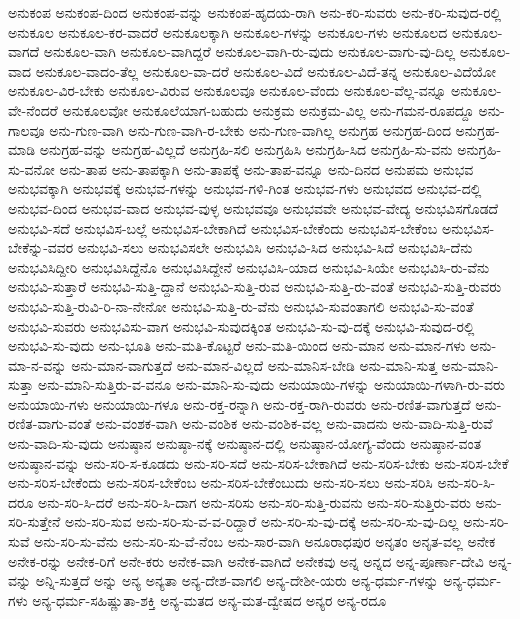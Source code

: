 {ಅನುಕಂಪ
ಅನುಕಂಪ-ದಿಂದ
ಅನುಕಂಪ-ವನ್ನು
ಅನುಕಂಪ-ಹೃದಯ-ರಾಗಿ
ಅನು-ಕರಿ-ಸುವರು
ಅನು-ಕರಿ-ಸುವುದ-ರಲ್ಲಿ
ಅನುಕೂಲ
ಅನುಕೂಲ-ಕರ-ವಾದರೆ
ಅನುಕೂಲಕ್ಕಾಗಿ
ಅನುಕೂಲ-ಗಳನ್ನು
ಅನುಕೂಲ-ಗಳು
ಅನುಕೂಲದ
ಅನುಕೂಲ-ವಾಗದೆ
ಅನುಕೂಲ-ವಾಗಿ
ಅನುಕೂಲ-ವಾಗಿದ್ದರೆ
ಅನುಕೂಲ-ವಾಗಿ-ರು-ವುದು
ಅನುಕೂಲ-ವಾಗು-ವು-ದಿಲ್ಲ
ಅನುಕೂಲ-ವಾದ
ಅನುಕೂಲ-ವಾದಂ-ತೆಲ್ಲ
ಅನುಕೂಲ-ವಾ-ದರೆ
ಅನುಕೂಲ-ವಿದೆ
ಅನುಕೂಲ-ವಿದೆ-ತನ್ನ
ಅನುಕೂಲ-ವಿದೆಯೋ
ಅನುಕೂಲ-ವಿರ-ಬೇಕು
ಅನುಕೂಲ-ವಿರುವ
ಅನುಕೂಲವೂ
ಅನುಕೂಲ-ವೆಂದು
ಅನುಕೂಲ-ವೆಲ್ಲ-ವನ್ನೂ
ಅನುಕೂಲ-ವೇ-ನೆಂದರೆ
ಅನುಕೂಲವೋ
ಅನುಕೂಲೆಯಾಗ-ಬಹುದು
ಅನುಕ್ರಮ
ಅನುಕ್ರಮ-ವಿಲ್ಲ
ಅನು-ಗಮನ-ರೂಪದ್ದೂ
ಅನು-ಗಾಲವೂ
ಅನು-ಗುಣ-ವಾಗಿ
ಅನು-ಗುಣ-ವಾಗಿ-ರ-ಬೇಕು
ಅನು-ಗುಣ-ವಾಗಿಲ್ಲ
ಅನುಗ್ರಹ
ಅನುಗ್ರಹ-ದಿಂದ
ಅನುಗ್ರಹ-ಮಾಡಿ
ಅನುಗ್ರಹ-ವನ್ನು
ಅನುಗ್ರಹ-ವಿಲ್ಲದೆ
ಅನುಗ್ರಹಿ-ಸಲಿ
ಅನುಗ್ರಹಿಸಿ
ಅನುಗ್ರಹಿ-ಸಿದ
ಅನುಗ್ರಹಿ-ಸು-ವನು
ಅನುಗ್ರಹಿ-ಸು-ವನೋ
ಅನು-ತಾಪ
ಅನು-ತಾಪಕ್ಕಾಗಿ
ಅನು-ತಾಪಕ್ಕೆ
ಅನು-ತಾಪ-ವನ್ನೂ
ಅನು-ದಿನದ
ಅನುಪಮ
ಅನುಭವ
ಅನುಭವಕ್ಕಾಗಿ
ಅನುಭವಕ್ಕೆ
ಅನುಭವ-ಗಳನ್ನು
ಅನುಭವ-ಗಳಿ-ಗಿಂತ
ಅನುಭವ-ಗಳು
ಅನುಭವದ
ಅನುಭವ-ದಲ್ಲಿ
ಅನುಭವ-ದಿಂದ
ಅನುಭವ-ವಾದ
ಅನುಭವ-ವುಳ್ಳ
ಅನುಭವವೂ
ಅನುಭವವೇ
ಅನುಭವ-ವೇದ್ಯ
ಅನುಭವಿಸಗೊಡದೆ
ಅನುಭವಿ-ಸದೆ
ಅನುಭವಿಸ-ಬಲ್ಲೆ
ಅನುಭವಿಸ-ಬೇಕಾಗಿದೆ
ಅನುಭವಿಸ-ಬೇಕೆಂದು
ಅನುಭವಿಸ-ಬೇಕೆಂಬ
ಅನುಭವಿಸ-ಬೇಕೆನ್ನು-ವವರ
ಅನುಭವಿ-ಸಲು
ಅನುಭವಿಸಲೇ
ಅನುಭವಿಸಿ
ಅನುಭವಿ-ಸಿದ
ಅನುಭವಿ-ಸಿದೆ
ಅನುಭವಿಸಿ-ದೆನು
ಅನುಭವಿಸಿದ್ದೀರಿ
ಅನುಭವಿಸಿದ್ದೆನೊ
ಅನುಭವಿಸಿದ್ದೇನೆ
ಅನುಭವಿಸಿ-ಯಾದ
ಅನುಭವಿ-ಸಿಯೇ
ಅನುಭವಿಸಿ-ರು-ವೆನು
ಅನುಭವಿ-ಸುತ್ತಾರೆ
ಅನುಭವಿ-ಸುತ್ತಿ-ದ್ದಾನೆ
ಅನುಭವಿ-ಸುತ್ತಿ-ರುವ
ಅನುಭವಿ-ಸುತ್ತಿ-ರು-ವಂತೆ
ಅನುಭವಿ-ಸುತ್ತಿ-ರುವರು
ಅನುಭವಿ-ಸುತ್ತಿ-ರುವಿ-ರಿ-ನಾ-ನೇನೋ
ಅನುಭವಿ-ಸುತ್ತಿ-ರು-ವೆನು
ಅನುಭವಿ-ಸುವಂತಾಗಲಿ
ಅನುಭವಿ-ಸು-ವಂತೆ
ಅನುಭವಿ-ಸುವರು
ಅನುಭವಿಸು-ವಾಗ
ಅನುಭವಿ-ಸುವುದಕ್ಕಿಂತ
ಅನುಭವಿ-ಸು-ವು-ದಕ್ಕೆ
ಅನುಭವಿ-ಸುವುದ-ರಲ್ಲಿ
ಅನುಭವಿ-ಸು-ವುದು
ಅನು-ಭೂತಿ
ಅನು-ಮತಿ-ಕೊಟ್ಟರೆ
ಅನು-ಮತಿ-ಯಿಂದ
ಅನು-ಮಾನ
ಅನು-ಮಾನ-ಗಳು
ಅನು-ಮಾ-ನ-ವನ್ನು
ಅನು-ಮಾನ-ವಾಗುತ್ತದೆ
ಅನು-ಮಾನ-ವಿಲ್ಲದೆ
ಅನು-ಮಾನಿಸ-ಬೇಡಿ
ಅನು-ಮಾನಿ-ಸುತ್ತ
ಅನು-ಮಾನಿ-ಸುತ್ತಾ
ಅನು-ಮಾನಿ-ಸುತ್ತಿರು-ವ-ವನೂ
ಅನು-ಮಾನಿ-ಸು-ವುದು
ಅನುಯಾಯಿ-ಗಳನ್ನು
ಅನುಯಾಯಿ-ಗಳಾಗಿ-ರು-ವರು
ಅನುಯಾಯಿ-ಗಳು
ಅನುಯಾಯಿ-ಗಳೂ
ಅನು-ರಕ್ತ-ರನ್ನಾಗಿ
ಅನು-ರಕ್ತ-ರಾಗಿ-ರುವರು
ಅನು-ರಣಿತ-ವಾಗುತ್ತದೆ
ಅನು-ರಣಿತ-ವಾಗು-ವಂತೆ
ಅನು-ವಂಶಕ-ವಾಗಿ
ಅನು-ವಂಶಿಕ
ಅನು-ವಂಶಿಕ-ವಲ್ಲ
ಅನು-ವಾದನು
ಅನು-ವಾದಿ-ಸುತ್ತಿ-ರುವೆ
ಅನು-ವಾದಿ-ಸು-ವುದು
ಅನುಷ್ಠಾನ
ಅನುಷ್ಠಾ-ನಕ್ಕೆ
ಅನುಷ್ಠಾನ-ದಲ್ಲಿ
ಅನುಷ್ಠಾನ-ಯೋಗ್ಯ-ವೆಂದು
ಅನುಷ್ಠಾನ-ವಂತ
ಅನುಷ್ಠಾನ-ವನ್ನು
ಅನು-ಸರಿ-ಸ-ಕೂಡದು
ಅನು-ಸರಿ-ಸದೆ
ಅನು-ಸರಿಸ-ಬೇಕಾಗಿದೆ
ಅನು-ಸರಿಸ-ಬೇಕು
ಅನು-ಸರಿಸ-ಬೇಕೆ
ಅನು-ಸರಿಸ-ಬೇಕೆಂದು
ಅನು-ಸರಿಸ-ಬೇಕೆಂಬ
ಅನು-ಸರಿಸ-ಬೇಕೆಂಬುದು
ಅನು-ಸರಿ-ಸಲು
ಅನು-ಸರಿಸಿ
ಅನು-ಸರಿ-ಸಿ-ದರೂ
ಅನು-ಸರಿ-ಸಿ-ದರೆ
ಅನು-ಸರಿ-ಸಿ-ದಾಗ
ಅನು-ಸರಿಸು
ಅನು-ಸರಿ-ಸುತ್ತಿ-ರುವನು
ಅನು-ಸರಿ-ಸುತ್ತಿರು-ವರು
ಅನು-ಸರಿ-ಸುತ್ತೇನೆ
ಅನು-ಸರಿ-ಸುವ
ಅನು-ಸರಿ-ಸು-ವ-ವ-ರಿದ್ದಾರೆ
ಅನು-ಸರಿ-ಸು-ವು-ದಕ್ಕೆ
ಅನು-ಸರಿ-ಸು-ವು-ದಿಲ್ಲ
ಅನು-ಸರಿ-ಸುವೆ
ಅನು-ಸರಿ-ಸು-ವೆನು
ಅನು-ಸರಿ-ಸು-ವೆ-ನೆಂಬ
ಅನು-ಸಾರ-ವಾಗಿ
ಅನೂರಾಧಪುರ
ಅನೃತಂ
ಅನೃತ-ವಲ್ಲ
ಅನೇಕ
ಅನೇಕ-ರನ್ನು
ಅನೇಕ-ರಿಗೆ
ಅನೇ-ಕರು
ಅನೇಕ-ವಾಗಿ
ಅನೇಕ-ವಾಗಿದೆ
ಅನೇಕವು
ಅನ್ನ
ಅನ್ನದ
ಅನ್ನ-ಪೂರ್ಣಾ-ದೇವಿ
ಅನ್ನ-ವನ್ನು
ಅನ್ನಿ-ಸುತ್ತದೆ
ಅನ್ನು
ಅನ್ಯ
ಅನ್ಯತಾ
ಅನ್ಯ-ದೇಶ-ವಾಗಲಿ
ಅನ್ಯ-ದೇಶೀ-ಯರು
ಅನ್ಯ-ಧರ್ಮ-ಗಳನ್ನು
ಅನ್ಯ-ಧರ್ಮ-ಗಳು
ಅನ್ಯ-ಧರ್ಮ-ಸಹಿಷ್ಣುತಾ-ಶಕ್ತಿ
ಅನ್ಯ-ಮತದ
ಅನ್ಯ-ಮತ-ದ್ವೇಷದ
ಅನ್ಯರ
ಅನ್ಯ-ರದೂ
}
